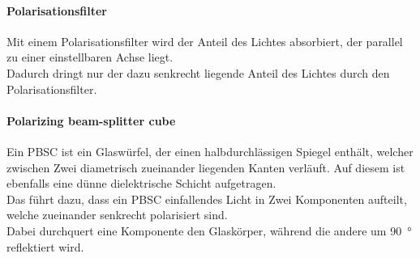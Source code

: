 \paragraph{Polarisationsfilter}
%
Mit einem Polarisationsfilter wird der Anteil des Lichtes 
absorbiert, der parallel zu einer einstellbaren Achse liegt.\\
Dadurch dringt nur der dazu senkrecht liegende Anteil des 
Lichtes durch den Polarisationsfilter.\\
%
\paragraph{Polarizing beam-splitter cube}
Ein PBSC ist ein Glaswürfel, der einen halbdurchlässigen Spiegel 
enthält, welcher zwischen Zwei diametrisch zueinander liegenden 
Kanten verläuft. Auf diesem ist ebenfalls eine dünne dielektrische 
Schicht aufgetragen.\\
Das führt dazu, dass ein PBSC einfallendes Licht in Zwei 
Komponenten aufteilt, welche zueinander senkrecht polarisiert sind.\\
Dabei durchquert eine Komponente den Glaskörper, während die 
andere um \SI{90}{\degree} reflektiert wird.\\
%

